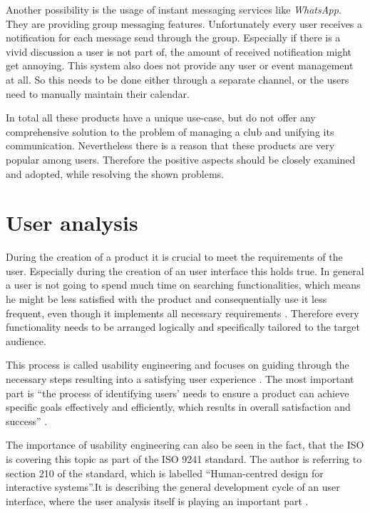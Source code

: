 Another possibility is the usage of instant messaging services like \emph{WhatsApp}. They are providing group messaging features. Unfortunately every user receives a notification for each message send through the group. Especially if there is a vivid discussion a user is not part of, the amount of received notification might get annoying. This system also does not provide any user or event management at all. So this needs to be done either through a separate channel, or the users need to manually maintain their calendar.

In total all these products have a unique use-case, but do not offer any comprehensive solution to the problem of managing a club and unifying its communication. Nevertheless there is a reason that these products are very popular among users. Therefore the positive aspects should be closely examined and adopted, while resolving the shown problems.

\section{User analysis}
\label{sec:UserAnalysis}

During the creation of a product it is crucial to meet the requirements of the user. Especially during the creation of an user interface this holds true. In general a user is not going to spend much time on searching functionalities, which means he might be less satisfied with the product and consequentially use it less frequent, even though it implements all necessary requirements \cite{Frank:2013aa}. Therefore every functionality needs to be arranged logically and specifically tailored to the target audience.

This process is called usability engineering and focuses on guiding through the necessary steps resulting into a satisfying user experience \cite{Nielsen:1993aa}. The most important part is \enquote{the process of identifying users’ needs to ensure a product can achieve specific goals effectively and efficiently, which results in overall satisfaction and success} \cite{Frank:2013aa}.

The importance of usability engineering can also be seen in the fact, that the \acrfull{ISO} is covering this topic as part of the ISO 9241 standard. The author is referring to section 210 of the standard, which is labelled \enquote{Human-centred design for interactive systems}.It is describing the general development cycle of an user interface, where the user analysis itself is playing an important part \cite[p. 13]{Gulzow:2015aa}.


